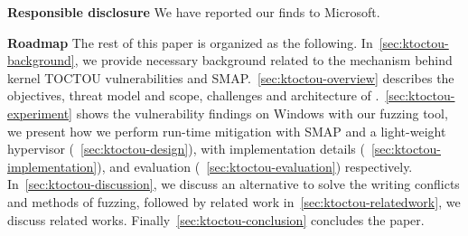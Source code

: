 \textbf{Responsible disclosure}
We have reported our finds to Microsoft. 

\textbf{Roadmap}
The rest of this paper is organized as the following. 
In~\autoref{sec:ktoctou-background}, we provide necessary background related to the mechanism behind kernel TOCTOU vulnerabilities and SMAP.~\autoref{sec:ktoctou-overview} describes the objectives, threat model and scope, challenges and architecture of \name.~\autoref{sec:ktoctou-experiment} shows the vulnerability findings on Windows with our fuzzing tool, we present how we perform run-time mitigation with SMAP and a light-weight hypervisor (~\autoref{sec:ktoctou-design}), with implementation details (~\autoref{sec:ktoctou-implementation}), and evaluation (~\autoref{sec:ktoctou-evaluation}) respectively.  In~\autoref{sec:ktoctou-discussion}, we discuss an alternative to solve the writing conflicts and methods of fuzzing, followed by related work in~\autoref{sec:ktoctou-relatedwork}, we discuss related works. Finally~\autoref{sec:ktoctou-conclusion} concludes the paper.
